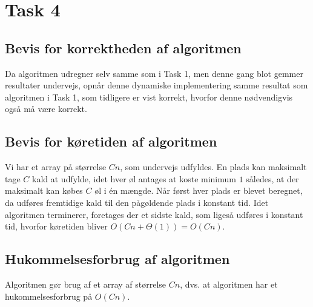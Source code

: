 \section{Task 4}
\subsection{Bevis for korrektheden af algoritmen}

Da algoritmen udregner selv samme som i Task 1, men denne gang blot gemmer resultater undervejs, opnår denne dynamiske implementering samme resultat som algoritmen i Task 1, som tidligere er vist korrekt, hvorfor denne nødvendigvis også må være korrekt. 

\subsection{Bevis for køretiden af algoritmen}

Vi har et array på størrelse $Cn$, som undervejs udfyldes.
En plads kan maksimalt tage $C$ kald at udfylde, idet hver øl antages at koste minimum $1$ således, at der maksimalt kan købes $C$ øl i én mængde. 
Når først hver plads er blevet beregnet, da udføres fremtidige kald til den pågøldende plads i konstant tid. Idet algoritmen terminerer, foretages der et sidste kald, som ligeså udføres i konstant tid, hvorfor køretiden bliver $O(Cn+\Theta(1)) = O(Cn)$.

\subsection{Hukommelsesforbrug af algoritmen}
Algoritmen gør brug af et array af størrelse $Cn$, dvs.
at algoritmen har et hukommelsesforbrug på $O(Cn)$.

